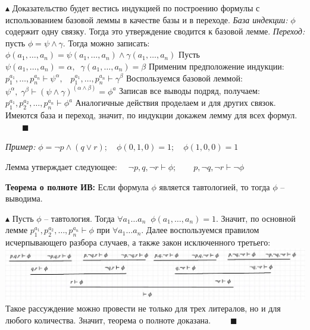 $\blacktriangle$ Доказательство будет вестись индукцией по построению формулы с использованием базовой леммы в качестве базы и в переходе.
\newline \textit{База индекции:} $\phi$ содержит  одну связку. Тогда это утверждение сводится к базовой лемме.
\newline \textit{Переход:} пусть $\phi = \psi \land \gamma$. Тогда можно записать: $\phi(a_1,\ldots,a_n) = \psi(a_1,\ldots,a_n) \land \gamma(a_1,\ldots,a_n)$
\newline Пусть $\psi(a_1,\ldots,a_n) = \alpha, \;\; \gamma(a_1,\ldots,a_n) = \beta$
\newline Применим предположение индукции: $p_1^{a_1},\ldots,p_n^{a_n} \vdash \psi^\alpha, \;\;\; p_1^{a_1},\ldots,p_n^{a_n} \vdash \gamma^\beta$
\newline Воспользуемся базовой леммой:
$\psi^\alpha, \; \gamma^\beta \vdash (\psi \land \gamma)^{(\alpha\land\beta)}=\phi^a $
\newline Записав все выводы подряд, получаем: $p_1^{a_1},p_2^{a_2},\ldots,p_n^{a_n} \vdash \phi^{a}$
\newline Аналогичные действия проделаем и для других связок. Имеются база и переход, значит, по индукции докажем лемму для всех формул. $\qquad \blacksquare$

\textit{Пример:} $\phi=\neg p \land (q\lor r); \quad \phi(0,1,0)=1;\quad \phi(1,0,0)=1$

Лемма утверждает следующее: $\quad \neg p, q, \neg r \vdash \phi; \qquad p, \neg q, \neg r \vdash \neg \phi$
\newline \par \textbf{Теорема о полноте ИВ:} Если формула $\phi$ является тавтологией, то тогда $\phi$ -- выводима. 

$\blacktriangle$ Пусть $\phi$ -- тавтология. Тогда $\forall a_1\ldots a_n \;\; \phi(a_1,\ldots,a_n) = 1$. Значит, по основной лемме $ p_1^{a_1},p_2^{a_2},\ldots,p_n^{a_n} \vdash \phi$ при $\forall a_1\ldots a_n$. Далее воспользуемся правилом исчерпывающего разбора случаев, а также закон исключенного третьего: \newline
\includegraphics[width=1\linewidth]{images/1.1_cases.png}
Такое рассуждение можно провести не только для трех литералов, но и для любого количества. Значит, теорема о полноте доказана. $\qquad \blacksquare$
